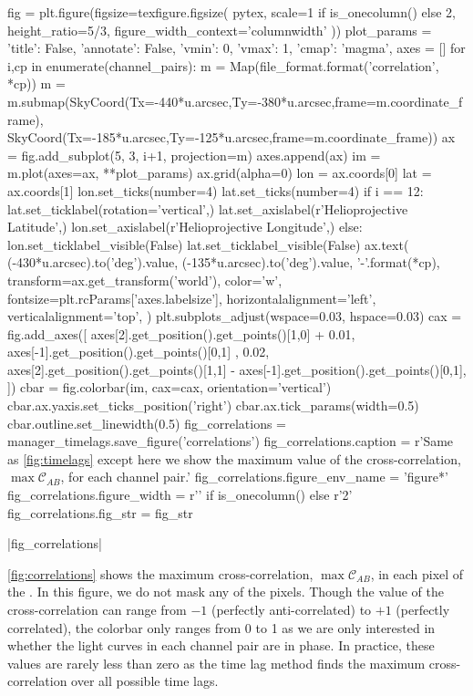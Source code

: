 \begin{pycode}
fig = plt.figure(figsize=texfigure.figsize(
    pytex,
    scale=1 if is_onecolumn() else 2,
    height_ratio=5/3,
    figure_width_context='columnwidth'
))
plot_params = {
    'title': False, 
    'annotate': False,
    'vmin': 0,
    'vmax': 1,
    'cmap': 'magma',
}
axes = []
for i,cp in enumerate(channel_pairs):
    m = Map(file_format.format('correlation', *cp))
    m = m.submap(SkyCoord(Tx=-440*u.arcsec,Ty=-380*u.arcsec,frame=m.coordinate_frame),
                 SkyCoord(Tx=-185*u.arcsec,Ty=-125*u.arcsec,frame=m.coordinate_frame))
    ax = fig.add_subplot(5, 3, i+1, projection=m)
    axes.append(ax)
    im = m.plot(axes=ax, **plot_params)
    ax.grid(alpha=0)
    lon = ax.coords[0]
    lat = ax.coords[1]
    lon.set_ticks(number=4)
    lat.set_ticks(number=4) 
    if i == 12:
        lat.set_ticklabel(rotation='vertical',)
        lat.set_axislabel(r'Helioprojective Latitude',)
        lon.set_axislabel(r'Helioprojective Longitude',)
    else:
        lon.set_ticklabel_visible(False)
        lat.set_ticklabel_visible(False)
    ax.text(
        (-430*u.arcsec).to('deg').value,
        (-135*u.arcsec).to('deg').value,
        '{}-{}'.format(*cp),
        transform=ax.get_transform('world'),
        color='w',
        fontsize=plt.rcParams['axes.labelsize'],
        horizontalalignment='left',
        verticalalignment='top',
    )
plt.subplots_adjust(wspace=0.03, hspace=0.03)
cax = fig.add_axes([
    axes[2].get_position().get_points()[1,0] + 0.01,
    axes[-1].get_position().get_points()[0,1] ,
    0.02,
    axes[2].get_position().get_points()[1,1] - axes[-1].get_position().get_points()[0,1], 
])
cbar = fig.colorbar(im, cax=cax, orientation='vertical')
cbar.ax.yaxis.set_ticks_position('right')
cbar.ax.tick_params(width=0.5)
cbar.outline.set_linewidth(0.5)
fig_correlations = manager_timelags.save_figure('correlations')
fig_correlations.caption = r'Same as \autoref{fig:timelags} except here we show the maximum value of the cross-correlation, $\max\mathcal{C}_{AB}$, for each channel pair.'
fig_correlations.figure_env_name = 'figure*'
fig_correlations.figure_width = r'\columnwidth' if is_onecolumn() else r'2\columnwidth'
fig_correlations.fig_str = fig_str
\end{pycode}
|fig_correlations|

\autoref{fig:correlations} shows the maximum cross-correlation, $\max\mathcal{C}_{AB}$, in each pixel of the \AR{}.
In this figure, we do not mask any of the pixels. Though the value of the cross-correlation can range from $-1$ (perfectly anti-correlated) to $+1$ (perfectly correlated), the colorbar only ranges from 0 to 1 as we are only interested in whether the light curves in each channel pair are in phase.
In practice, these values are rarely less than zero as the time lag method finds the maximum cross-correlation over all possible time lags.

